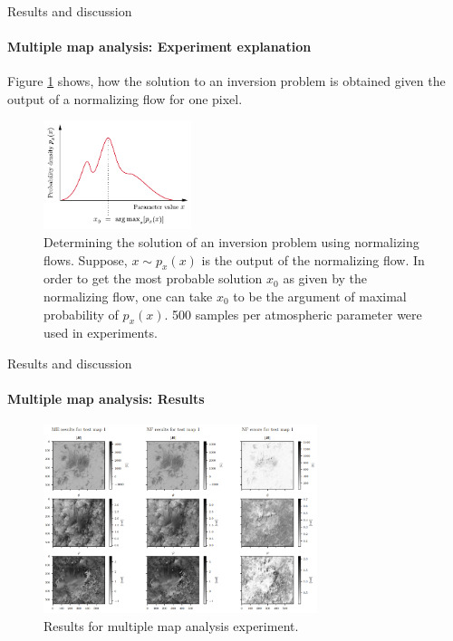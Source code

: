 \documentclass{beamer}
\begin{document}

\begin{frame}[allowframebreaks]{Results and discussion}
\framesubtitle{Multiple map analysis: Experiment explanation} %
Figure \cref{fig:argmax} shows, how the solution to an inversion problem is obtained given the output of a normalizing flow for one pixel.

\begin{figure}[h!]
	\centering
	\includegraphics[width=4.3cm]{figures/thesis/argmax.pdf}
	\caption{Determining the solution of an inversion problem using normalizing flows. Suppose, $x \sim p_x(x)$ is the output of the normalizing flow. In order to get the most probable solution $x_0$ as given by the normalizing flow, one can take $x_0$ to be the argument of maximal probability of $p_x(x)$. 500 samples per atmospheric parameter were used in experiments.}
	\label{fig:argmax}
\end{figure}
\end{frame}

\begin{frame}[allowframebreaks]{Results and discussion}
	\framesubtitle{Multiple map analysis: Results} %
	\begin{figure}[h!]
		\centering
		\includegraphics[width=8cm]{figures/presentation/exp3_fig1.png}
		\caption{Results for multiple map analysis experiment.}
		\label{fig:exp3_fig1}
	\end{figure}
\end{frame}
\end{document}

